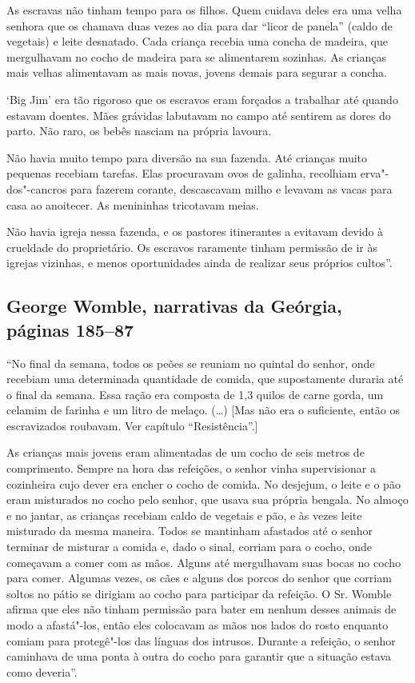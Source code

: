As escravas não tinham tempo para os filhos. Quem cuidava deles era uma
velha senhora que os chamava duas vezes ao dia para dar ``licor de
panela'' (caldo de vegetais) e leite desnatado. Cada criança recebia uma
concha de madeira, que mergulhavam no cocho de madeira para se
alimentarem sozinhas. As crianças mais velhas alimentavam as mais novas,
jovens demais para segurar a concha.

`Big Jim' era tão rigoroso que os escravos eram forçados a trabalhar até
quando estavam doentes. Mães grávidas labutavam no campo até sentirem as
dores do parto. Não raro, os bebês nasciam na própria lavoura.

Não havia muito tempo para diversão na sua fazenda. Até crianças muito
pequenas recebiam tarefas. Elas procuravam ovos de galinha, recolhiam
erva"-dos"-cancros para fazerem corante, descascavam milho e levavam as
vacas para casa ao anoitecer. As menininhas tricotavam meias.

Não havia igreja nessa fazenda, e os pastores itinerantes a evitavam
devido à crueldade do proprietário. Os escravos raramente tinham
permissão de ir às igrejas vizinhas, e menos oportunidades ainda de
realizar seus próprios cultos''.

\subsection{George Womble, narrativas da Geórgia, páginas 185--87}
\label{ref307}

``No final da semana, todos os peões se reuniam no quintal do senhor,
onde recebiam uma determinada quantidade de comida, que supostamente
duraria até o final da semana. Essa ração era composta de 1,3 quilos de
carne gorda, um celamim de farinha e um litro de melaço. (\ldots{})
{[}Mas não era o suficiente, então os escravizados roubavam. Ver capítulo ``Resistência''.{]}

As crianças mais jovens eram alimentadas de um cocho de seis metros de
comprimento. Sempre na hora das refeições, o senhor vinha supervisionar
a cozinheira cujo dever era encher o cocho de comida. No desjejum, o
leite e o pão eram misturados no cocho pelo senhor, que usava sua
própria bengala. No almoço e no jantar, as crianças recebiam caldo de
vegetais e pão, e às vezes leite misturado da mesma maneira. Todos se
mantinham afastados até o senhor terminar de misturar a comida e, dado o
sinal, corriam para o cocho, onde começavam a comer com as mãos. Alguns
até mergulhavam suas bocas no cocho para comer. Algumas vezes, os cães e
alguns dos porcos do senhor que corriam soltos no pátio se dirigiam ao
cocho para participar da refeição. O Sr. Womble afirma que eles não
tinham permissão para bater em nenhum desses animais de modo a
afastá"-los, então eles colocavam as mãos nos lados do rosto enquanto
comiam para protegê"-los das línguas dos intrusos. Durante a refeição, o
senhor caminhava de uma ponta à outra do cocho para garantir que a
situação estava como deveria''.

